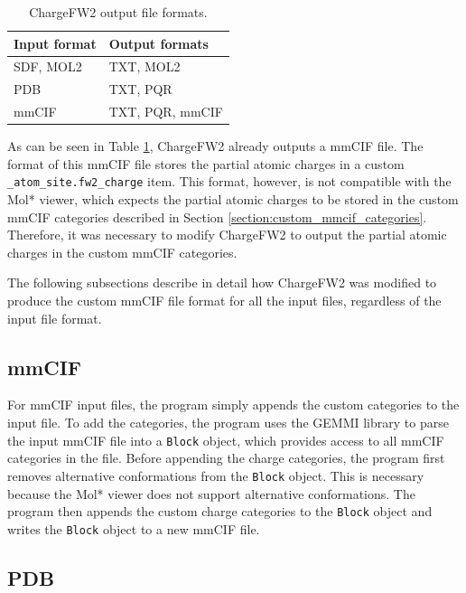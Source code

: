 \documentclass[
  digital,     %
  oneside,     %
  nosansbold,  %
  nocolorbold, %
  lof,         %
  lot,         %
]{fithesis4}
\begin{document}
\begin{table}[htbp]
  \centering
  \begin{tabular}{|l|l|}
    \hline
    \textbf{Input format} & \textbf{Output formats} \\
    \hline
    SDF, MOL2 & TXT, MOL2 \\
    \hline
    PDB & TXT, PQR \\
    \hline
    mmCIF & TXT, PQR, mmCIF \\
    \hline
  \end{tabular}
  \caption{ChargeFW2 output file formats.}
  \label{table:chargefw2_output_formats}
\end{table}

As can be seen in Table \ref{table:chargefw2_output_formats}, ChargeFW2 already outputs a mmCIF file. The format of this mmCIF file stores the partial atomic charges in a custom \texttt{\_atom\_site.fw2\_charge} item. This format, however, is not compatible with the Mol* viewer, which expects the partial atomic charges to be stored in the custom mmCIF categories described in Section \ref{section:custom_mmcif_categories}. Therefore, it was necessary to modify ChargeFW2 to output the partial atomic charges in the custom mmCIF categories.

The following subsections describe in detail how ChargeFW2 was modified to produce the custom mmCIF file format for all the input files, regardless of the input file format.

\subsection{mmCIF}

For mmCIF input files, the program simply appends the custom categories to the input file. To add the categories, the program uses the GEMMI library \cite{wojdyr2022gemmi} to parse the input mmCIF file into a \texttt{Block} object, which provides access to all mmCIF categories in the file. Before appending the charge categories, the program first removes alternative conformations from the \texttt{Block} object. This is necessary because the Mol* viewer does not support alternative conformations. The program then appends the custom charge categories to the \texttt{Block} object and writes the \texttt{Block} object to a new mmCIF file.

\subsection{PDB}
\end{document}
